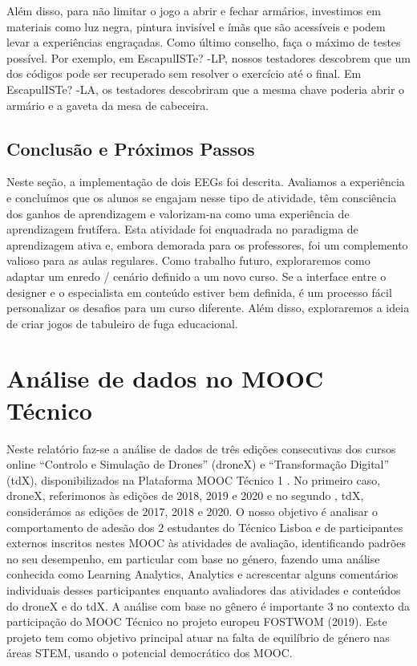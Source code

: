 Além disso, para não limitar o jogo a abrir e fechar armários, investimos em materiais como luz negra, pintura invisível e ímãs que são acessíveis e podem levar a experiências engraçadas. Como último conselho, faça o máximo de testes possível. Por exemplo, em EscapulISTe? -LP, nossos testadores descobrem que um dos códigos pode ser recuperado sem resolver o exercício até o final. Em EscapulISTe? -LA, os testadores descobriram que a mesma chave poderia abrir o armário e a gaveta da mesa de cabeceira.

\subsection{Conclusão e Próximos Passos}

Neste seção, a implementação de dois EEGs foi descrita. Avaliamos a experiência e concluímos que os alunos se engajam nesse tipo de atividade, têm consciência dos ganhos de aprendizagem e valorizam-na como uma experiência de aprendizagem frutífera. Esta atividade foi enquadrada no paradigma de aprendizagem ativa e, embora demorada para os professores, foi um complemento valioso para as aulas regulares. Como trabalho futuro, exploraremos como adaptar um enredo / cenário definido a um novo curso. Se a interface entre o designer e o especialista em conteúdo estiver bem definida, é um processo fácil personalizar os desafios para um curso diferente. Além disso, exploraremos a ideia de criar jogos de tabuleiro de fuga educacional.

\section{Análise de dados no MOOC Técnico}

Neste relatório faz-se a análise de dados de três edições consecutivas dos cursos online “Controlo e Simulação de Drones” (droneX) e “Transformação Digital” (tdX), disponibilizados na Plataforma MOOC Técnico 1 . No primeiro caso, droneX, referimonos às edições de 2018, 2019 e 2020 e no segundo , tdX, considerámos as edições de 2017, 2018 e 2020. O nosso objetivo é analisar o comportamento de adesão dos 2
estudantes do Técnico Lisboa e de participantes externos inscritos nestes MOOC às atividades de avaliação, identificando padrões no seu desempenho, em particular com base no género, fazendo uma análise conhecida como Learning Analytics, Analytics e acrescentar alguns comentários individuais desses participantes enquanto avaliadores das atividades e conteúdos do droneX e do tdX. A análise com base no gênero é importante 3 no contexto da participação do MOOC Técnico no projeto
europeu FOSTWOM (2019). Este projeto tem como objetivo principal atuar na falta de equilíbrio de género nas áreas STEM, usando o potencial democrático dos MOOC.

